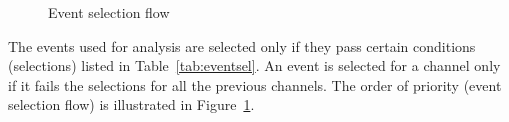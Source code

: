 \documentclass[letterpaper,12pt]{article}
\begin{document}
\begin{figure} %
  \scriptsize
  \centering
{}

\caption{Event selection flow}
\label{fig:eventselflow}
\end{figure}

The events used for analysis are selected only if they pass certain conditions (selections) listed in Table~\ref{tab:eventsel}. An event is selected for a channel only if it fails the selections for all the previous channels. The order of priority (event selection flow) is illustrated in Figure~\ref{fig:eventselflow}.
\end{document}
